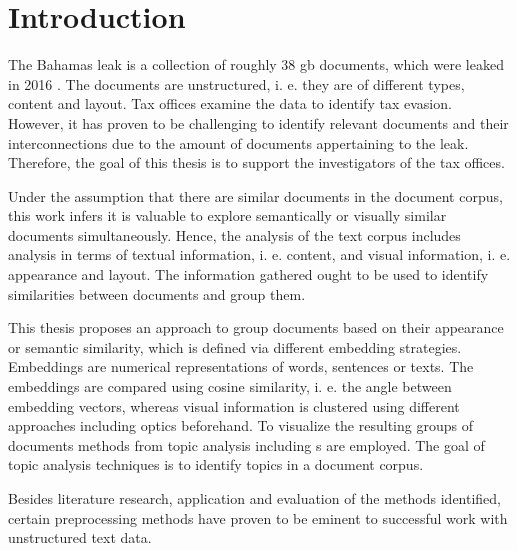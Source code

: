 \chapter{Introduction}\label{ch:introduction}

The Bahamas leak is a collection of roughly 38 \ac{gb} documents, which were leaked in 2016 \cite{data-corpus-bahamas-leaks}.
The documents are unstructured, i. e. they are of different types, content and layout.
Tax offices examine the data to identify tax evasion.
However, it has proven to be challenging to identify relevant documents and their interconnections due to the amount of documents appertaining to the leak.
Therefore, the goal of this thesis is to support the investigators of the tax offices.

Under the assumption that there are similar documents in the document corpus, 
this work infers it is valuable to explore semantically or visually similar documents simultaneously.
Hence, the analysis of the text corpus includes analysis in terms of textual information, i. e. content, 
and visual information, i. e. appearance and layout.
The information gathered ought to be used to identify similarities between documents and group them.

This thesis proposes an approach to group documents based on their appearance or semantic similarity, 
which is defined via different embedding strategies.
Embeddings are numerical representations of words, sentences or texts.
The embeddings are compared using cosine similarity, i. e. the angle between embedding vectors, 
whereas visual information is clustered using different approaches including \ac{optics} beforehand.
To visualize the resulting groups of documents methods from topic analysis including \wordcloud{}s are employed.
The goal of topic analysis techniques is to identify topics in a document corpus.

Besides literature research, application and evaluation of the methods identified, 
certain preprocessing methods have proven to be eminent to successful work with unstructured text data.

